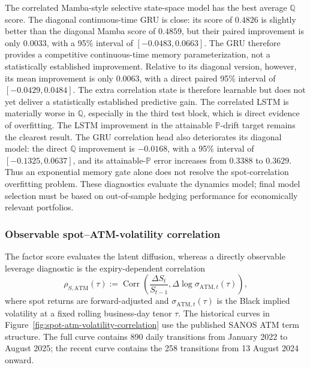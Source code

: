 \documentclass[11pt]{article}
\newcommand{\Q}{\mathbb Q}
\newcommand{\PP}{\mathbb P}
\theoremstyle{plain}
\theoremstyle{definition}
\theoremstyle{remark}
\begin{document}
The correlated Mamba-style selective state-space model has the best average $\Q$ score.
The diagonal continuous-time GRU is close: its score of $0.4826$ is slightly
better than the diagonal Mamba score of $0.4859$, but their paired improvement
is only $0.0033$, with a 95\% interval of $[-0.0483,0.0663]$.  The GRU therefore
provides a competitive continuous-time memory parameterization, not a
statistically established improvement.
Relative to its diagonal version, however, its mean improvement is only
$0.0063$, with a direct paired 95\% interval of
$[-0.0429,0.0484]$.  The extra correlation state is therefore learnable but
does not yet deliver a statistically established predictive gain.  The
correlated LSTM is materially worse in $\Q$, especially in the third test
block, which is direct evidence of overfitting.  The LSTM improvement in the
attainable $\PP$-drift target remains the clearest result.
The GRU correlation head also deteriorates its diagonal model: the direct
$\Q$ improvement is $-0.0168$, with a 95\% interval of
$[-0.1325,0.0637]$, and its attainable-$\PP$ error increases from $0.3388$
to $0.3629$.  Thus an exponential memory gate alone does not resolve the
spot-correlation overfitting problem.  These diagnostics
evaluate the dynamics model; final model selection must be based on
out-of-sample hedging performance for economically relevant portfolios.

\subsubsection{Observable spot--ATM-volatility correlation}
\label{sec:spot-atm-volatility-correlation}

The factor score evaluates the latent diffusion, whereas a directly observable
leverage diagnostic is the expiry-dependent correlation
\begin{equation}
  \rho_{S,\mathrm{ATM}}(\tau)
  :=
  \operatorname{Corr}\!\left(
    \frac{\Delta S_t}{S_{t-1}},
    \Delta\log\sigma_{\mathrm{ATM},t}(\tau)
  \right),
  \label{eq:spot-atm-volatility-correlation}
\end{equation}
where spot returns are forward-adjusted and
$\sigma_{\mathrm{ATM},t}(\tau)$ is the Black implied volatility at a fixed
rolling business-day tenor $\tau$.  The historical curves in
Figure~\ref{fig:spot-atm-volatility-correlation} use the published SANOS ATM
term structure.  The full curve contains 890 daily transitions from January
2022 to August 2025; the recent curve contains the 258 transitions from
13 August 2024 onward.
\end{document}
